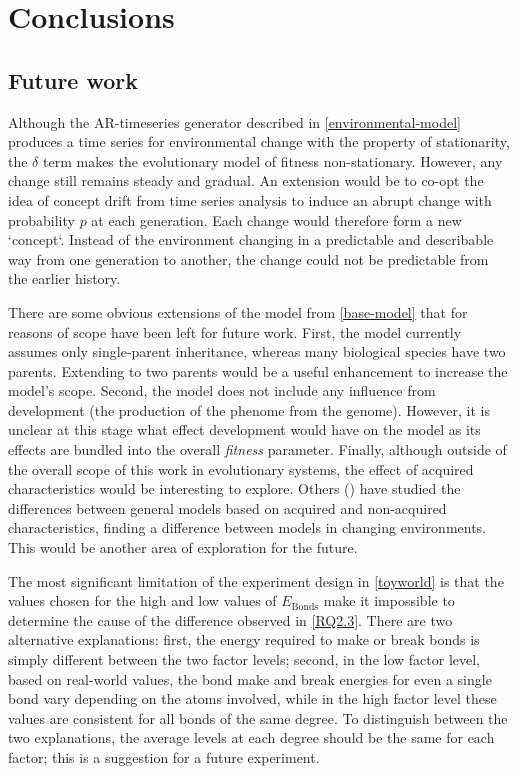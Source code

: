 \chapter{Conclusions}\label{thesis-conclusions}


\section{Future work}

Although the AR-timeseries generator described in \cref{environmental-model} produces a time series for environmental change with the property of stationarity, the $\delta$ term makes the evolutionary model of fitness non-stationary. However, any change still remains steady and gradual. An extension would be to co-opt the idea of concept drift from time series analysis to induce an abrupt change with probability $p$ at each generation. Each change would therefore form a new `concept`. Instead of the environment changing in a predictable and describable way from one generation to another, the change could not be predictable from the earlier history.

There are some obvious extensions of the model from \cref{base-model} that for reasons of scope have been left for future work. First, the model currently assumes only single-parent inheritance, whereas many biological species have two parents. Extending to two parents would be a useful enhancement to increase the model's scope. Second, the model does not include any influence from development (the production of the phenome from the genome). However, it is unclear at this stage what effect development would have on the model as its effects are bundled into the overall \emph{fitness} parameter. Finally, although outside of the overall scope of this work in evolutionary systems, the effect of acquired characteristics would be interesting to explore. Others (\eg \textcite{Gaucherel2012,Paenke:2007ie,Sasaki:2000dq}) have studied the differences between general models based on acquired and non-acquired characteristics, finding a difference between models in changing environments. This would be another area of exploration for the future.


The most significant limitation of the experiment design in \cref{toyworld} is that the values chosen for the high and low values of $E_\mathrm{Bonds}$ make it impossible to determine the cause of the difference observed in \cref{RQ2.3}. There are two alternative explanations: first, the energy required to make or break bonds is simply different between the two factor levels; second, in the low factor level, based on real-world values, the bond make and break energies for even a single bond vary depending on the atoms involved, while in the high factor level these values are consistent for all bonds of the same degree. To distinguish between the two explanations, the average levels at each degree should be the same for each factor; this is a suggestion for a future experiment.

